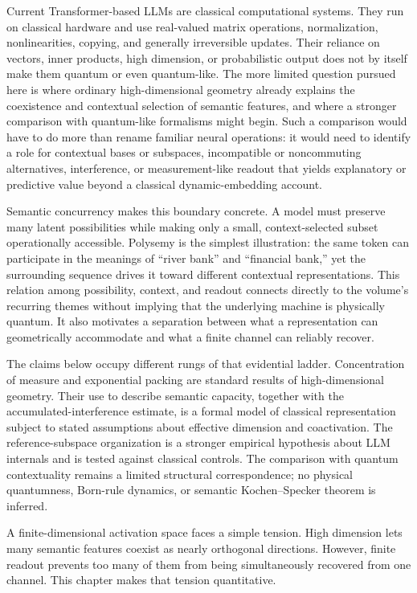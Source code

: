 \documentclass[
  aps,
  reprint,
  superscriptaddress,
  floatfix,
  nofootinbib,
  longbibliography
]{revtex4-2}
\begin{document}
Current Transformer-based LLMs are classical computational systems.  They
run on classical hardware and use real-valued matrix operations,
normalization, nonlinearities, copying, and generally irreversible updates.
Their reliance on vectors, inner products, high dimension, or probabilistic
output does not by itself make them quantum or even quantum-like.  The more
limited question pursued here is where ordinary high-dimensional geometry
already explains the coexistence and contextual selection of semantic
features, and where a stronger comparison with quantum-like formalisms might
begin.  Such a comparison would have to do more than rename familiar neural
operations: it would need to identify a role for contextual bases or subspaces,
incompatible or noncommuting alternatives, interference, or
measurement-like readout that yields explanatory or predictive value beyond
a classical dynamic-embedding account.

Semantic concurrency makes this boundary concrete.  A model must preserve
many latent possibilities while making only a small, context-selected subset
operationally accessible.  Polysemy is the simplest illustration: the same
token can participate in the meanings of ``river bank'' and ``financial
bank,'' yet the surrounding sequence drives it toward different contextual
representations.  This relation among possibility, context, and readout
connects directly to the volume's recurring themes without implying that the
underlying machine is physically quantum.  It also motivates a separation
between what a representation can geometrically accommodate and what a
finite channel can reliably recover.



The claims below occupy different rungs of that evidential
ladder.  Concentration of measure and exponential packing are standard
results of high-dimensional geometry.  Their use to describe semantic
capacity, together with the accumulated-interference estimate, is a formal
model of classical representation subject to stated assumptions about
effective dimension and coactivation.  The reference-subspace organization is
a stronger empirical hypothesis about LLM internals and is tested against
classical controls.  The comparison with quantum contextuality remains a
limited structural correspondence; no physical quantumness, Born-rule
dynamics, or semantic Kochen--Specker theorem is inferred.

A finite-dimensional activation space faces a simple tension. High
dimension lets many semantic features coexist as nearly orthogonal
directions.
However, finite readout prevents too many of them from being
simultaneously recovered from one channel. This chapter makes that
tension quantitative.
\end{document}
